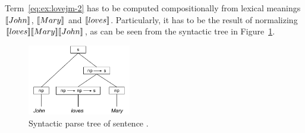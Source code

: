 Term~\eqref{eq:ex:lovejm-2} has to be computed compositionally from lexical meanings $[\![John]\!]$, $[\![Mary]\!]$ and $[\![loves]\!]$. Particularly, it has to be the result of normalizing  $[\![loves]\!] [\![Mary]\!] [\![John]\!]$, as can be seen from the syntactic tree in Figure~\ref{fig:JohnLovesMary}.
\begin{figure}[h!]
 \centering
    \includegraphics[width=0.4\textwidth]{images/JohnLovesMary.pdf}
\caption{Syntactic parse tree of sentence .} \label{fig:JohnLovesMary}
\end{figure}

